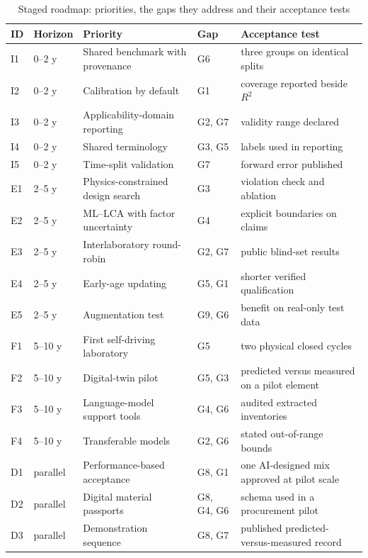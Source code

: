 \documentclass[pdflatex,sn-basic]{sn-jnl}
\begin{document}
\begin{table}[htbp]
\caption{Staged roadmap: priorities, the gaps they address and their acceptance tests}\label{tab:roadmap}
\centering
{\footnotesize
\begin{tabular}{llp{}lp{}}
\toprule
ID & Horizon & Priority & Gap & Acceptance test \\
\midrule
I1 & 0--2 y & Shared benchmark with provenance & G6 & three groups on identical splits \\
I2 & 0--2 y & Calibration by default & G1 & coverage reported beside $R^2$ \\
I3 & 0--2 y & Applicability-domain reporting & G2, G7 & validity range declared \\
I4 & 0--2 y & Shared terminology & G3, G5 & labels used in reporting \\
I5 & 0--2 y & Time-split validation & G7 & forward error published \\
E1 & 2--5 y & Physics-constrained design search & G3 & violation check and ablation \\
E2 & 2--5 y & ML--LCA with factor uncertainty & G4 & explicit boundaries on claims \\
E3 & 2--5 y & Interlaboratory round-robin & G2, G7 & public blind-set results \\
E4 & 2--5 y & Early-age updating & G5, G1 & shorter verified qualification \\
E5 & 2--5 y & Augmentation test & G9, G6 & benefit on real-only test data \\
F1 & 5--10 y & First self-driving laboratory & G5 & two physical closed cycles \\
F2 & 5--10 y & Digital-twin pilot & G5, G3 & predicted versus measured on a pilot element \\
F3 & 5--10 y & Language-model support tools & G4, G6 & audited extracted inventories \\
F4 & 5--10 y & Transferable models & G2, G6 & stated out-of-range bounds \\
D1 & parallel & Performance-based acceptance & G8, G1 & one AI-designed mix approved at pilot scale \\
D2 & parallel & Digital material passports & G8, G4, G6 & schema used in a procurement pilot \\
D3 & parallel & Demonstration sequence & G8, G7 & published predicted-versus-measured record \\
\bottomrule
\end{tabular}}
\end{table}
\end{document}
